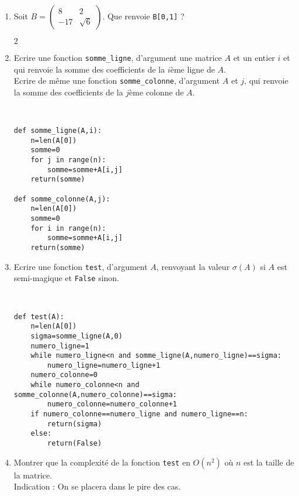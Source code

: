 \begin{enumerate}
\item Soit $B=\begin{pmatrix}
8&2\\-17&\sqrt{6}
\end{pmatrix}$. Que renvoie \verb?B[0,1]? ?
\begin{solution}
$2$
\end{solution}
\item Ecrire une fonction \verb?somme_ligne?, d'argument une matrice $A$ et un entier $i$ et qui renvoie la somme des coefficients de la $i$ème ligne de $A$.\\
Ecrire de même une fonction \verb?somme_colonne?, d'argument $A$ et $j$, qui renvoie la somme des coefficients de la $j$ème colonne de $A$.
\begin{solution}~\\
\vspace*{-0.7cm}
\begin{verbatim}
def somme_ligne(A,i):
    n=len(A[0])
    somme=0
    for j in range(n):
        somme=somme+A[i,j]
    return(somme)

def somme_colonne(A,j):
    n=len(A[0])
    somme=0
    for i in range(n):
        somme=somme+A[i,j]
    return(somme) 
\end{verbatim}
\end{solution}
\item Ecrire une fonction \verb?test?, d'argument $A$, renvoyant la valeur $\sigma(A)$ si $A$ est semi-magique et \verb?False? sinon.
\begin{solution}~\\
\vspace*{-0.7cm}
\begin{verbatim}
def test(A):
    n=len(A[0])
    sigma=somme_ligne(A,0)
    numero_ligne=1
    while numero_ligne<n and somme_ligne(A,numero_ligne)==sigma:
        numero_ligne=numero_ligne+1
    numero_colonne=0
    while numero_colonne<n and somme_colonne(A,numero_colonne)==sigma:
        numero_colonne=numero_colonne+1
    if numero_colonne==numero_ligne and numero_ligne==n:
        return(sigma)
    else:
        return(False)
\end{verbatim}
\end{solution}
\item Montrer que la complexité de la fonction \verb?test? en $O(n^2)$ où $n$ est la taille de la matrice.\\
Indication : On se placera dans le pire des cas. 
\begin{solution}
\end{solution}
\end{enumerate}

